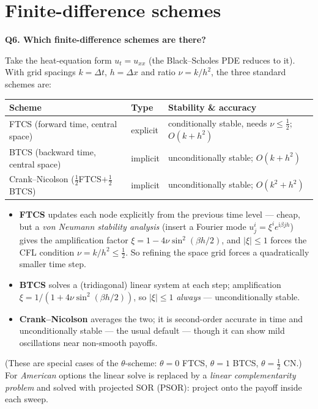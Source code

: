 \documentclass[11pt]{article}
\newcommand{\ii}{\mathrm{i}}
\newcommand{\Qhead}[1]{\bigskip\noindent\textbf{\large #1}\par\nobreak\smallskip}
\begin{document}
\section{Finite-difference schemes}
\Qhead{Q6. Which finite-difference schemes are there?}
Take the heat-equation form $u_t=u_{xx}$ (the Black--Scholes PDE reduces to it). With grid spacings $k=\Delta t$,
$h=\Delta x$ and ratio $\nu=k/h^2$, the three standard schemes are:
\begin{center}
\renewcommand{\arraystretch}{1.3}
\begin{tabular}{lll}
\toprule
\textbf{Scheme} & \textbf{Type} & \textbf{Stability \& accuracy}\\
\midrule
FTCS (forward time, central space) & explicit & conditionally stable, needs $\nu\le\tfrac12$; $O(k+h^2)$\\
BTCS (backward time, central space) & implicit & unconditionally stable; $O(k+h^2)$\\
Crank--Nicolson ($\tfrac12$FTCS$+\tfrac12$BTCS) & implicit & unconditionally stable; $O(k^2+h^2)$\\
\bottomrule
\end{tabular}
\end{center}
\begin{itemize}
  \item \textbf{FTCS} updates each node explicitly from the previous time level --- cheap, but a
  \emph{von Neumann stability analysis} (insert a Fourier mode $u_j^i=\xi^i e^{\ii\beta j h}$) gives the
  amplification factor $\xi=1-4\nu\sin^2(\beta h/2)$, and $|\xi|\le1$ forces the CFL condition
  $\nu=k/h^2\le\tfrac12$. So refining the space grid forces a quadratically smaller time step.
  \item \textbf{BTCS} solves a (tridiagonal) linear system at each step; amplification
  $\xi=1/(1+4\nu\sin^2(\beta h/2))$, so $|\xi|\le1$ \emph{always} --- unconditionally stable.
  \item \textbf{Crank--Nicolson} averages the two; it is second-order accurate in time and unconditionally
  stable --- the usual default --- though it can show mild oscillations near non-smooth payoffs.
\end{itemize}
(These are special cases of the $\theta$-scheme: $\theta=0$ FTCS, $\theta=1$ BTCS, $\theta=\tfrac12$ CN.)
For \emph{American} options the linear solve is replaced by a \emph{linear complementarity problem} and solved
with projected SOR (PSOR): project onto the payoff inside each sweep.
\end{document}
